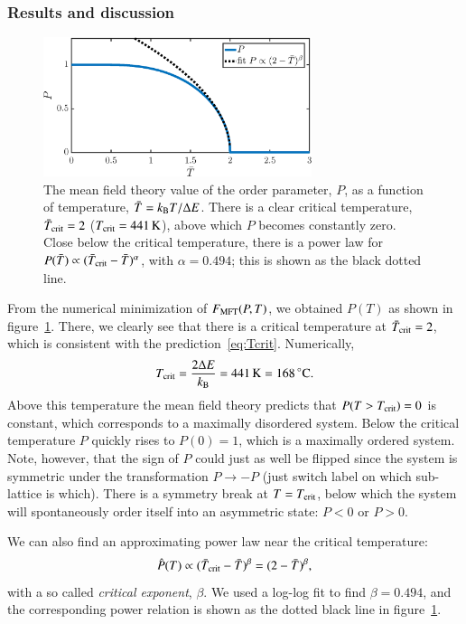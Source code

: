 \subsubsection*{Results and discussion}
\begin{figure}[!ht]
\begin{center}
  \includegraphics[width=0.7\textwidth]{../figures/P_MFT} 
  \caption{The mean field theory value of the order parameter, $P$, as
  a function of temperature, $\bar{T}=k_\mathrm{B} T/\Delta{E}$. There is a
  clear critical temperature, $\bar{T}_{\rm crit}=2$
  ($T_{\rm crit}=\unit[441]{K}$), above which $P$ becomes constantly
  zero. Close below the critical temperature, there is a power law for
  $P(\bar{T})\propto(\bar{T}_{\rm crit}-\bar{T})^{\alpha}$, with
  $\alpha=0.494$; this is shown as the black dotted line. }
  \label{fig:T1:P}
\end{center}
\end{figure}

From the numerical minimization of $F_{\text{MFT}}(P,T)$, we obtained $P(T)$
as shown in figure~\ref{fig:T1:P}. There, we clearly see that there is
a critical temperature at $\bar{T}_{\rm crit}=2$, which is consistent with the prediction~\eqref{eq:Tcrit}. Numerically,
\begin{equation}
T_{\rm crit}=\frac{2\Delta{E}}{\kB}
=\unit[441]{K}=\unit[168]{^{\circ}C}.
\end{equation}
Above this temperature the mean field theory predicts that
$P(T>T_{\rm crit})=0$ is constant, which corresponds to a maximally
disordered system. Below the critical temperature $P$ quickly rises to
$P(0)=1$, which is a maximally ordered system. Note, however, that the
sign of $P$ could just as well be flipped since the system is
symmetric under the transformation $P\to-P$ (just switch label on
which sub-lattice is which). There is a symmetry break at $T=T_{\rm
  crit}$, below which the system will spontaneously order itself into
an asymmetric state: $P<0$ or $P>0$.

We can also find an approximating power law near the critical
temperature:
\begin{equation}\label{eq:alpha}
\hat{P}(T)\propto (\bar{T}_{\rm crit}-\bar{T})^{\beta}=(2-\bar{T})^{\beta},
\end{equation}
with a so called \emph{critical exponent}, $\beta$. We used a log-log
fit to find $\beta=0.494$, and the corresponding power relation is
shown as the dotted black line in figure~\ref{fig:T1:P}. 


